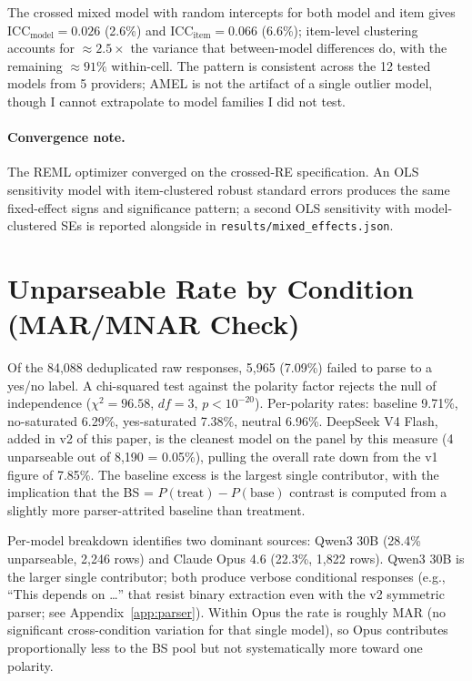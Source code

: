 \documentclass[10pt,twocolumn]{article}
\begin{document}
The crossed mixed model with random intercepts for both model and item gives ICC$_\text{model} = 0.026$ (2.6\%) and ICC$_\text{item} = 0.066$ (6.6\%); item-level clustering accounts for $\approx 2.5\times$ the variance that between-model differences do, with the remaining $\approx 91\%$ within-cell. The pattern is consistent across the 12 tested models from 5 providers; AMEL is not the artifact of a single outlier model, though I cannot extrapolate to model families I did not test.

\paragraph{Convergence note.}
The REML optimizer converged on the crossed-RE specification. An OLS sensitivity model with item-clustered robust standard errors produces the same fixed-effect signs and significance pattern; a second OLS sensitivity with model-clustered SEs is reported alongside in \texttt{results/mixed\_effects.json}.

\section{Unparseable Rate by Condition (MAR/MNAR Check)}
\label{app:unparseable}

Of the 84,088 deduplicated raw responses, 5,965 (7.09\%) failed to parse to a yes/no label.
A chi-squared test against the polarity factor rejects the null of independence ($\chi^2 = 96.58$, $df = 3$, $p < 10^{-20}$).
Per-polarity rates: baseline 9.71\%, no-saturated 6.29\%, yes-saturated 7.38\%, neutral 6.96\%.
DeepSeek V4 Flash, added in v2 of this paper, is the cleanest model on the panel by this measure (4 unparseable out of 8,190 = 0.05\%), pulling the overall rate down from the v1 figure of 7.85\%.
The baseline excess is the largest single contributor, with the implication that the BS = $P(\text{treat}) - P(\text{base})$ contrast is computed from a slightly more parser-attrited baseline than treatment.

Per-model breakdown identifies two dominant sources: Qwen3 30B (28.4\% unparseable, 2{,}246 rows) and Claude Opus 4.6 (22.3\%, 1{,}822 rows). Qwen3 30B is the larger single contributor; both produce verbose conditional responses (e.g., ``This depends on \ldots'' that resist binary extraction even with the v2 symmetric parser; see Appendix~\ref{app:parser}).
Within Opus the rate is roughly MAR (no significant cross-condition variation for that single model), so Opus contributes proportionally less to the BS pool but not systematically more toward one polarity.
\end{document}
